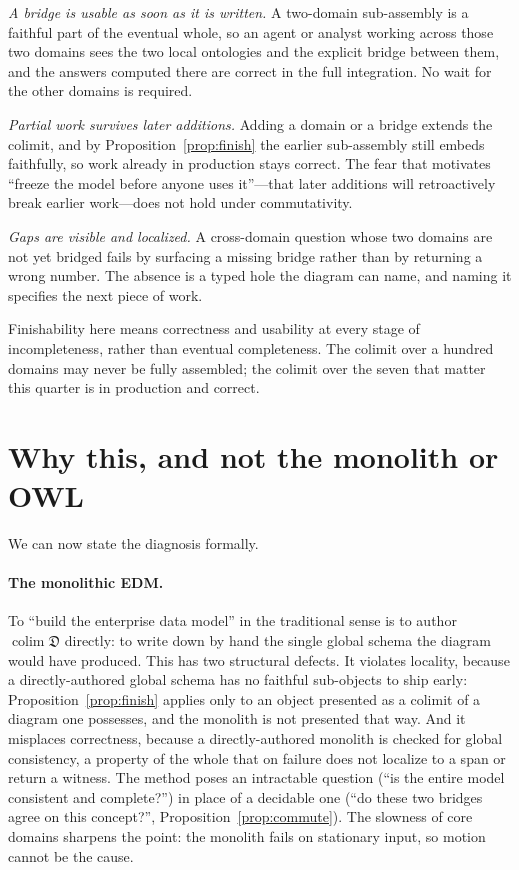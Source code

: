 \documentclass[11pt]{article}
\theoremstyle{plain}
\theoremstyle{definition}
\begin{document}
\emph{A bridge is usable as soon as it is written.} A two-domain sub-assembly is a faithful part of the eventual whole, so an agent or analyst working across those two domains sees the two local ontologies and the explicit bridge between them, and the answers computed there are correct in the full integration. No wait for the other domains is required.

\emph{Partial work survives later additions.} Adding a domain or a bridge extends the colimit, and by Proposition~\ref{prop:finish} the earlier sub-assembly still embeds faithfully, so work already in production stays correct. The fear that motivates ``freeze the model before anyone uses it''---that later additions will retroactively break earlier work---does not hold under commutativity.

\emph{Gaps are visible and localized.} A cross-domain question whose two domains are not yet bridged fails by surfacing a missing bridge rather than by returning a wrong number. The absence is a typed hole the diagram can name, and naming it specifies the next piece of work.

Finishability here means correctness and usability at every stage of incompleteness, rather than eventual completeness. The colimit over a hundred domains may never be fully assembled; the colimit over the seven that matter this quarter is in production and correct.

\section{Why this, and not the monolith or OWL}\label{sec:owl}

We can now state the diagnosis formally.

\paragraph{The monolithic EDM.} To ``build the enterprise data model'' in the traditional sense is to author $\operatorname{colim}\mathfrak{D}$ directly: to write down by hand the single global schema the diagram would have produced. This has two structural defects. It violates locality, because a directly-authored global schema has no faithful sub-objects to ship early: Proposition~\ref{prop:finish} applies only to an object presented as a colimit of a diagram one possesses, and the monolith is not presented that way. And it misplaces correctness, because a directly-authored monolith is checked for global consistency, a property of the whole that on failure does not localize to a span or return a witness. The method poses an intractable question (``is the entire model consistent and complete?'') in place of a decidable one (``do these two bridges agree on this concept?'', Proposition~\ref{prop:commute}). The slowness of core domains sharpens the point: the monolith fails on stationary input, so motion cannot be the cause.
\end{document}
